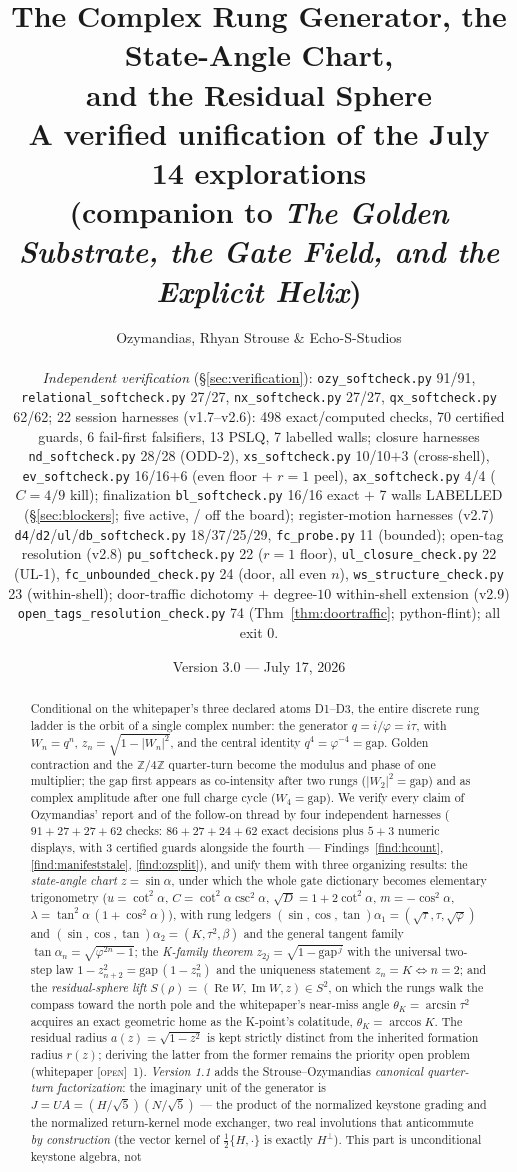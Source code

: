 \documentclass[11pt]{article}
\title{\bfseries The Complex Rung Generator, the State-Angle Chart,\\
and the Residual Sphere\\[4pt]
\large A verified unification of the July 14 explorations\\
(companion to \emph{The Golden Substrate, the Gate Field, and the Explicit Helix})}
\author{Ozymandias, Rhyan Strouse \& Echo-S-Studios\\[4pt]
\parbox{0.92\textwidth}{\footnotesize\setlength{\parindent}{0pt}
\emph{Independent verification} (\S\ref{sec:verification}):
\texttt{ozy\_softcheck.py} 91/91, \texttt{relational\_softcheck.py} 27/27,
\texttt{nx\_softcheck.py} 27/27, \texttt{qx\_softcheck.py} 62/62;
22 session harnesses (v1.7--v2.6): 498 exact/computed checks, 70 certified guards,
6 fail-first falsifiers, 13 PSLQ, 7 labelled walls; closure harnesses
\texttt{nd\_softcheck.py} 28/28 (ODD-2), \texttt{xs\_softcheck.py} 10/10$+$3
(cross-shell), \texttt{ev\_softcheck.py} 16/16$+$6 (even floor $+$ $r{=}1$ peel),
\texttt{ax\_softcheck.py} 4/4 ($C{=}4/9$ kill); finalization
\texttt{bl\_softcheck.py} 16/16 exact $+$ 7 walls LABELLED (\S\ref{sec:blockers};
five active, \hx{BL-G4}/\hx{BL-G7} off the board); register-motion harnesses (v2.7)
\texttt{d4}/\texttt{d2}/\texttt{ul}/\texttt{db\_softcheck.py} 18/37/25/29,
\texttt{fc\_probe.py} 11 (bounded); open-tag resolution (v2.8)
\texttt{pu\_softcheck.py} 22 ($r{=}1$ floor), \texttt{ul\_closure\_check.py} 22
(UL-1), \texttt{fc\_unbounded\_check.py} 24 (door, all even $n$),
\texttt{ws\_structure\_check.py} 23 (within-shell); door-traffic dichotomy $+$
degree-$10$ within-shell extension (v2.9) \texttt{open\_tags\_resolution\_check.py}
74 (Thm~\ref{thm:doortraffic}; python-flint); all exit 0.}}
\date{Version 3.0 --- July 17, 2026}
\newcommand{\tagO}{\textcolor{cO}{\textsc{[open]}}}
\newcommand{\Z}{\mathbb{Z}}
\newcommand{\gp}{\varphi}
\newcommand{\gapc}{\mathrm{gap}}
\DeclareMathOperator{\Rea}{Re}
\DeclareMathOperator{\Ima}{Im}
\theoremstyle{plain}
\theoremstyle{definition}
\theoremstyle{remark}
\begin{document}
\maketitle

\begin{abstract}
\noindent
Conditional on the whitepaper's three declared atoms D1--D3, the entire discrete
rung ladder is the orbit of a single complex number: the generator
$q=i/\gp=i\tau$, with $W_n=q^n$, $z_n=\sqrt{1-|W_n|^2}$, and the central identity
$q^4=\gp^{-4}=\gapc$. Golden contraction and the $\Z/4\Z$ quarter-turn become the
modulus and phase of one multiplier; the gap first appears as co-intensity after
two rungs ($|W_2|^2=\gapc$) and as complex amplitude after one full charge cycle
($W_4=\gapc$). We verify every claim of Ozymandias' report and of the follow-on
thread by four independent harnesses ($91+27+27+62$ checks: $86{+}27{+}24{+}62$
exact decisions plus $5{+}3$ numeric displays, with $3$ certified guards
alongside the fourth --- Findings~\ref{find:hcount}, \ref{find:manifeststale},
\ref{find:ozsplit}), and unify them with three
organizing results: the \emph{state-angle chart} $z=\sin\alpha$, under which the
whole gate dictionary becomes elementary trigonometry ($u=\cot^2\alpha$,
$C=\cot^2\alpha\csc^2\alpha$, $\sqrt D=1+2\cot^2\alpha$, $m=-\cos^2\alpha$,
$\lambda=\tan^2\alpha\,(1+\cos^2\alpha)$), with rung ledgers
$(\sin,\cos,\tan)\alpha_1=(\sqrt\tau,\tau,\sqrt\gp)$ and
$(\sin,\cos,\tan)\alpha_2=(K,\tau^2,\beta)$ and the general tangent family
$\tan\alpha_n=\sqrt{\gp^{2n}-1}$; the \emph{K-family theorem}
$z_{2j}=\sqrt{1-\gapc^{\,j}}$ with the universal two-step law
$1-z_{n+2}^2=\gapc\,(1-z_n^2)$ and the uniqueness statement $z_n=K\iff n=2$; and
the \emph{residual-sphere lift} $S(\rho)=(\Rea W,\Ima W,z)\in S^2$, on which the
rungs walk the compass toward the north pole and the whitepaper's near-miss angle
$\theta_K=\arcsin\tau^2$ acquires an exact geometric home as the K-point's
colatitude, $\theta_K=\arccos K$. The residual radius $a(z)=\sqrt{1-z^2}$ is kept
strictly distinct from the inherited formation radius $r(z)$; deriving the latter
from the former remains the priority open problem (whitepaper \tagO{}~1). \emph{Version 1.1}
adds the Strouse--Ozymandias \emph{canonical quarter-turn factorization}: the
imaginary unit of the generator is
$J=UA=(H/\sqrt5)(N/\sqrt5)$ --- the product of the normalized keystone grading
and the normalized return-kernel mode exchanger, two real involutions that
anticommute \emph{by construction} (the vector kernel of $\tfrac12\{H,\cdot\}$
is exactly $H^\perp$). This part is unconditional keystone algebra, not

\end{abstract}
\end{document}
